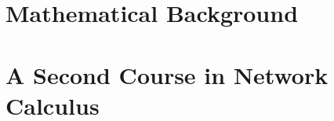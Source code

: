 \documentclass[11pt,twoside,onecolumn,a4paper]{book}
\begin{document}
\part{Mathematical Background}

\part{A Second Course in Network Calculus}


\printindex
\end{document}
